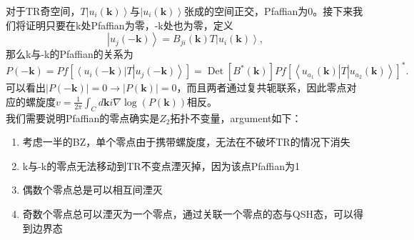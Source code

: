 \documentclass[10pt,openany]{book}
\theoremstyle{thmstyle} %
\theoremstyle{defstyle} %
\theoremstyle{prostyle} %
\begin{document}
对于TR奇空间，$T\left|u_i(\mathbf{k})\right\rangle$与$\left|u_i(\mathbf{k})\right\rangle$张成的空间正交，Pfaffian为0。接下来我们将证明只要在k处Pfaffian为零，-k处也为零，定义
\begin{equation}
  \left|u_j(-\mathbf{k})\right\rangle=B_{j i}(\mathbf{k}) T\left|u_i(\mathbf{k})\right\rangle,
\end{equation}
那么k与-k的Pfaffian的关系为
\begin{equation}
  P(-\mathbf{k})=P f\left[\left\langle u_i(-\mathbf{k})\right| T\left|u_j(-\mathbf{k})\right\rangle\right]=\operatorname{Det}\left[B^*(\mathbf{k})\right] P f\left[\left\langle u_{a_1}(\mathbf{k})\right| T\left|u_{a_2}(\mathbf{k})\right\rangle\right]^* .
\end{equation}
可以看出$|P(-\mathbf{k})|=0\to|P(\mathbf{k})|=0$，而且两者通过复共轭联系，因此零点对应的螺旋度$v=\frac{1}{2 \pi} \int_C d \mathbf{k} i \nabla \log (P(\mathbf{k}))$相反。\\
我们需要说明Pfaffian的零点确实是$Z_2$拓扑不变量，argument如下：\\
\begin{enumerate}
  \item 考虑一半的BZ，单个零点由于携带螺旋度，无法在不破坏TR的情况下消失
  \item k与-k的零点无法移动到TR不变点湮灭掉，因为该点Pfaffian为1
  \item 偶数个零点总是可以相互间湮灭
  \item 奇数个零点总可以湮灭为一个零点，通过关联一个零点的态与QSH态，可以得到边界态
\end{enumerate}
\end{document}
